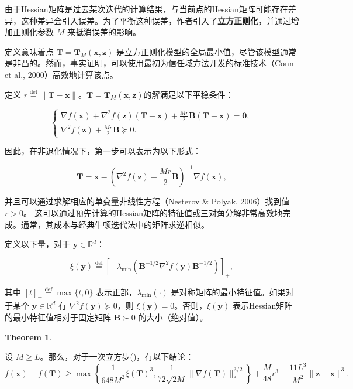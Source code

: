 \documentclass[a4paper,twoside,AutoFakeBold]{article}
\theoremstyle{definition}
\newtheorem{thrm2}{{Theorem}}[section]
\begin{document}
由于Hessian矩阵是过去某次迭代的计算结果，与当前点的Hessian矩阵可能存在差异，这种差异会引入误差。为了平衡这种误差，作者引入了\textbf{立方正则化}，并通过增加正则化参数 \(M\) 来抵消误差的影响。

定义意味着点 \(\mathbf{T} = \mathbf{T}_{M}(\mathbf{x},\mathbf{z})\) 是立方正则化模型的全局最小值，尽管该模型通常是非凸的。然而，事实证明，可以使用最初为信任域方法开发的标准技术（Conn et al., 2000）高效地计算该点。

定义 \(r \stackrel{\text{def}}{=} \|\mathbf{T} - \mathbf{x}\|\)。\(\mathbf{T} = \mathbf{T}_{M}(\mathbf{x},\mathbf{z})\)的解满足以下平稳条件：

\[
\begin{cases}
\nabla f(\mathbf{x}) + \nabla^{2}f(\mathbf{z})(\mathbf{T} - \mathbf{x}) + \frac{M r}{2} \mathbf{B}(\mathbf{T} - \mathbf{x}) = \mathbf{0}, \\
\nabla^{2}f(\mathbf{z}) + \frac{M r}{2} \mathbf{B} \succeq 0.
\end{cases}
\]

因此，在非退化情况下，第一步可以表示为以下形式：

\begin{equation}\label{5}
\mathbf{T} = \mathbf{x} - \left( \nabla^{2}f(\mathbf{z}) + \frac{M r}{2} \mathbf{B} \right)^{-1} \nabla f(\mathbf{x}), \tag{5}
\end{equation}

并且可以通过求解相应的单变量非线性方程（Nesterov \& Polyak, 2006）找到值 \(r > 0\)。
这可以通过预先计算的Hessian矩阵的特征值或三对角分解非常高效地完成。通常，其成本与经典牛顿迭代法中的矩阵求逆相似。

定义以下量，对于 \(\mathbf{y} \in \mathbb{R}^{d}\)：

\begin{equation}\label{6}
\xi(\mathbf{y}) \stackrel{\text{def}}{=} \left[ -\lambda_{\min} \left( \mathbf{B}^{-1/2} \nabla^{2}f(\mathbf{y}) \mathbf{B}^{-1/2} \right) \right]_{+}, \tag{6}
\end{equation}

其中 \([t]_{+} \stackrel{\text{def}}{=} \max\{t, 0\}\) 表示正部，\(\lambda_{\min}(\cdot)\) 是对称矩阵的最小特征值。如果对于某个 \(\mathbf{y} \in \mathbb{R}^{d}\) 有 \(\nabla^{2}f(\mathbf{y}) \succeq 0\)，则 \(\xi(\mathbf{y}) = 0\)。否则，\(\xi(\mathbf{y})\) 表示Hessian矩阵的最小特征值相对于固定矩阵 \(\mathbf{B} \succ 0\) 的大小（绝对值）。

\begin{mdframed}
	

\begin{thrm2}\label{thrm:o2.1}
	
设 \(M \geq L\)。那么，对于一次立方步()，有以下结论：
\begin{equation}\label{7}
f(\mathbf{x}) - f(\mathbf{T}) \geq \max \left\{ \frac{1}{648M^{2}} \xi(\mathbf{T})^{3}, 
\frac{1}{72\sqrt{2M}} \|\nabla f(\mathbf{T})\|_{*}^{3/2} \right\} + \frac{M}{48} r^{3} - \frac{11L^{3}}{M^{2}} \|\mathbf{z} - \mathbf{x}\|^{3}. \tag{7}
\end{equation}
\end{thrm2}
\end{mdframed}
\end{document}
